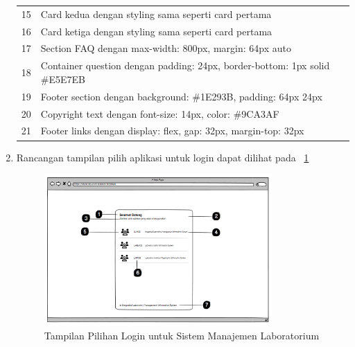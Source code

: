 \begin{enumerate}
\begin{longtable}{c p{}}
		      15                      & Card kedua dengan styling sama seperti card pertama                                                                   \\
		      16                      & Card ketiga dengan styling sama seperti card pertama                                                                  \\
		      17                      & Section FAQ dengan max-width: 800px, margin: 64px auto                                                                \\
		      18                      & Container question dengan padding: 24px, border-bottom: 1px solid \#E5E7EB                                            \\
		      19                      & Footer section dengan background: \#1E293B, padding: 64px 24px                                                        \\
		      20                      & Copyright text dengan font-size: 14px, color: \#9CA3AF                                                                \\
		      21                      & Footer links dengan display: flex, gap: 32px, margin-top: 32px                                                        \\
	      \end{longtable}

	\item Rancangan tampilan pilih aplikasi untuk login dapat dilihat pada \pic~\ref{fig:kelola-jadwal-2}
	      \begin{figure}
		      \centering
		      \includegraphics[width=0.82\textwidth]{konten/gambar/pilih-login.png}
		      \caption{Tampilan Pilihan Login untuk Sistem Manajemen Laboratorium}
		      \label{fig:kelola-jadwal-2}
	      \end{figure}


\end{enumerate}
